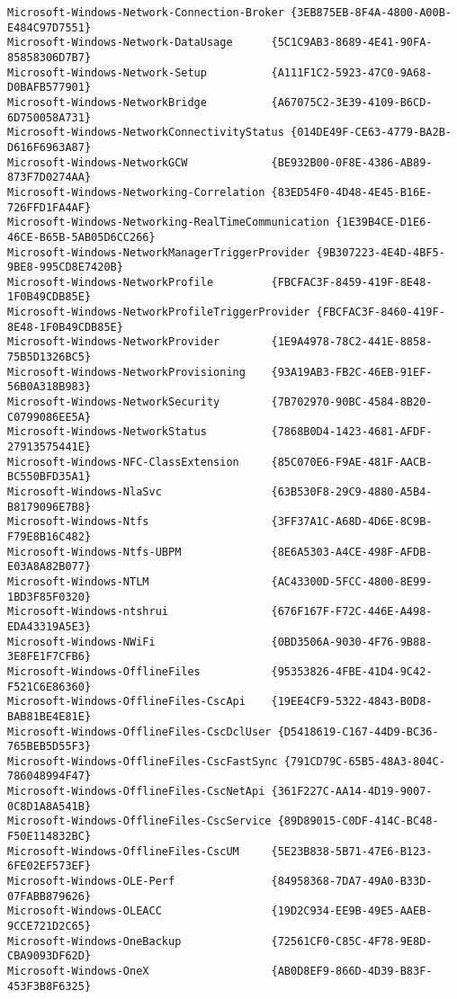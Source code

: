 \documentclass{report}
\begin{document}
\begin{lstlisting}[breaklines=true,basicstyle=\tiny]
Microsoft-Windows-Network-Connection-Broker {3EB875EB-8F4A-4800-A00B-E484C97D7551}
Microsoft-Windows-Network-DataUsage      {5C1C9AB3-8689-4E41-90FA-85858306D7B7}
Microsoft-Windows-Network-Setup          {A111F1C2-5923-47C0-9A68-D0BAFB577901}
Microsoft-Windows-NetworkBridge          {A67075C2-3E39-4109-B6CD-6D750058A731}
Microsoft-Windows-NetworkConnectivityStatus {014DE49F-CE63-4779-BA2B-D616F6963A87}
Microsoft-Windows-NetworkGCW             {BE932B00-0F8E-4386-AB89-873F7D0274AA}
Microsoft-Windows-Networking-Correlation {83ED54F0-4D48-4E45-B16E-726FFD1FA4AF}
Microsoft-Windows-Networking-RealTimeCommunication {1E39B4CE-D1E6-46CE-B65B-5AB05D6CC266}
Microsoft-Windows-NetworkManagerTriggerProvider {9B307223-4E4D-4BF5-9BE8-995CD8E7420B}
Microsoft-Windows-NetworkProfile         {FBCFAC3F-8459-419F-8E48-1F0B49CDB85E}
Microsoft-Windows-NetworkProfileTriggerProvider {FBCFAC3F-8460-419F-8E48-1F0B49CDB85E}
Microsoft-Windows-NetworkProvider        {1E9A4978-78C2-441E-8858-75B5D1326BC5}
Microsoft-Windows-NetworkProvisioning    {93A19AB3-FB2C-46EB-91EF-56B0A318B983}
Microsoft-Windows-NetworkSecurity        {7B702970-90BC-4584-8B20-C0799086EE5A}
Microsoft-Windows-NetworkStatus          {7868B0D4-1423-4681-AFDF-27913575441E}
Microsoft-Windows-NFC-ClassExtension     {85C070E6-F9AE-481F-AACB-BC550BFD35A1}
Microsoft-Windows-NlaSvc                 {63B530F8-29C9-4880-A5B4-B8179096E7B8}
Microsoft-Windows-Ntfs                   {3FF37A1C-A68D-4D6E-8C9B-F79E8B16C482}
Microsoft-Windows-Ntfs-UBPM              {8E6A5303-A4CE-498F-AFDB-E03A8A82B077}
Microsoft-Windows-NTLM                   {AC43300D-5FCC-4800-8E99-1BD3F85F0320}
Microsoft-Windows-ntshrui                {676F167F-F72C-446E-A498-EDA43319A5E3}
Microsoft-Windows-NWiFi                  {0BD3506A-9030-4F76-9B88-3E8FE1F7CFB6}
Microsoft-Windows-OfflineFiles           {95353826-4FBE-41D4-9C42-F521C6E86360}
Microsoft-Windows-OfflineFiles-CscApi    {19EE4CF9-5322-4843-B0D8-BAB81BE4E81E}
Microsoft-Windows-OfflineFiles-CscDclUser {D5418619-C167-44D9-BC36-765BEB5D55F3}
Microsoft-Windows-OfflineFiles-CscFastSync {791CD79C-65B5-48A3-804C-786048994F47}
Microsoft-Windows-OfflineFiles-CscNetApi {361F227C-AA14-4D19-9007-0C8D1A8A541B}
Microsoft-Windows-OfflineFiles-CscService {89D89015-C0DF-414C-BC48-F50E114832BC}
Microsoft-Windows-OfflineFiles-CscUM     {5E23B838-5B71-47E6-B123-6FE02EF573EF}
Microsoft-Windows-OLE-Perf               {84958368-7DA7-49A0-B33D-07FABB879626}
Microsoft-Windows-OLEACC                 {19D2C934-EE9B-49E5-AAEB-9CCE721D2C65}
Microsoft-Windows-OneBackup              {72561CF0-C85C-4F78-9E8D-CBA9093DF62D}
Microsoft-Windows-OneX                   {AB0D8EF9-866D-4D39-B83F-453F3B8F6325}

\end{lstlisting}
\end{document}
